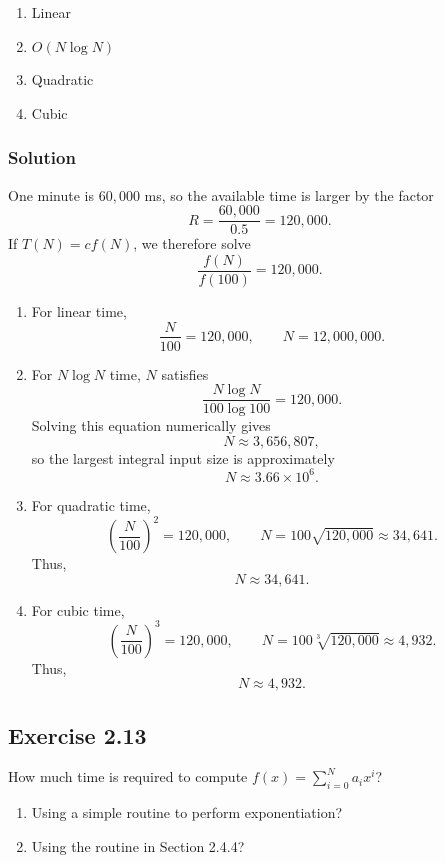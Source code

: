 \documentclass[12pt,a4paper]{article}
\begin{document}
\begin{enumerate}
  \renewcommand{\labelenumi}{\alph{enumi}.}
  \item Linear
  \item $O(N\log N)$
  \item Quadratic
  \item Cubic
\end{enumerate}

\subsubsection*{\color{sectionnavy}Solution}

One minute is $60{,}000$ ms, so the available time is larger by the
factor
\[
R=\frac{60{,}000}{0.5}=120{,}000.
\]
If $T(N)=c f(N)$, we therefore solve
\[
\frac{f(N)}{f(100)}=120{,}000.
\]

\begin{enumerate}
  \renewcommand{\labelenumi}{\alph{enumi}.}

  \item For linear time,
  \[
  \frac{N}{100}=120{,}000,
  \qquad
  \boxed{N=12{,}000{,}000}.
  \]

  \item For $N\log N$ time, $N$ satisfies
  \[
  \frac{N\log N}{100\log 100}=120{,}000.
  \]
  Solving this equation numerically gives
  \[
  N\approx3{,}656{,}807,
  \]
  so the largest integral input size is approximately
  \[
  \boxed{N\approx3.66\times10^6}.
  \]

  \item For quadratic time,
  \[
  \left(\frac{N}{100}\right)^2=120{,}000,
  \qquad
  N=100\sqrt{120{,}000}\approx34{,}641.
  \]
  Thus,
  \[
  \boxed{N\approx34{,}641}.
  \]

  \item For cubic time,
  \[
  \left(\frac{N}{100}\right)^3=120{,}000,
  \qquad
  N=100\sqrt[3]{120{,}000}\approx4{,}932.
  \]
  Thus,
  \[
  \boxed{N\approx4{,}932}.
  \]
\end{enumerate}

\subsection*{\color{sectionnavy}Exercise 2.13}

\noindent
How much time is required to compute
$f(x)=\sum_{i=0}^{N}a_i x^i$?

\begin{enumerate}
  \renewcommand{\labelenumi}{\alph{enumi}.}
  \item Using a simple routine to perform exponentiation?
  \item Using the routine in Section 2.4.4?
\end{enumerate}
\end{document}
